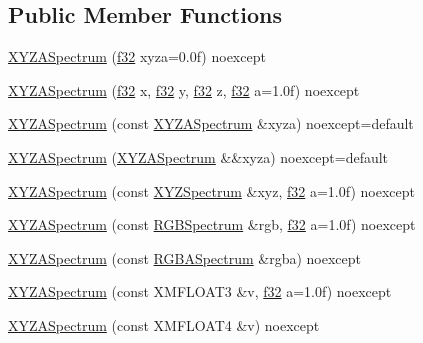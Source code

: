 \subsection*{Public Member Functions}
\begin{DoxyCompactItemize}
\item 
\hyperlink{structmage_1_1_x_y_z_a_spectrum_a1d2fb595a7f0d0d9e37e0bd9f1ce0d74}{X\+Y\+Z\+A\+Spectrum} (\hyperlink{namespacemage_a6a44ad388483959dc4dff9f2aef91431}{f32} xyza=0.\+0f) noexcept
\item 
\hyperlink{structmage_1_1_x_y_z_a_spectrum_a80c216d440ef74dc60fdeda55f2b7474}{X\+Y\+Z\+A\+Spectrum} (\hyperlink{namespacemage_a6a44ad388483959dc4dff9f2aef91431}{f32} x, \hyperlink{namespacemage_a6a44ad388483959dc4dff9f2aef91431}{f32} y, \hyperlink{namespacemage_a6a44ad388483959dc4dff9f2aef91431}{f32} z, \hyperlink{namespacemage_a6a44ad388483959dc4dff9f2aef91431}{f32} a=1.\+0f) noexcept
\item 
\hyperlink{structmage_1_1_x_y_z_a_spectrum_ae088d21ba6cd6684b1347064570a5ff2}{X\+Y\+Z\+A\+Spectrum} (const \hyperlink{structmage_1_1_x_y_z_a_spectrum}{X\+Y\+Z\+A\+Spectrum} \&xyza) noexcept=default
\item 
\hyperlink{structmage_1_1_x_y_z_a_spectrum_a08e4635f76feced3cabc8a8c7289f036}{X\+Y\+Z\+A\+Spectrum} (\hyperlink{structmage_1_1_x_y_z_a_spectrum}{X\+Y\+Z\+A\+Spectrum} \&\&xyza) noexcept=default
\item 
\hyperlink{structmage_1_1_x_y_z_a_spectrum_a386891a5434a510ea532cd023c26124a}{X\+Y\+Z\+A\+Spectrum} (const \hyperlink{structmage_1_1_x_y_z_spectrum}{X\+Y\+Z\+Spectrum} \&xyz, \hyperlink{namespacemage_a6a44ad388483959dc4dff9f2aef91431}{f32} a=1.\+0f) noexcept
\item 
\hyperlink{structmage_1_1_x_y_z_a_spectrum_a8746aecc15212f8eb2d632c2194395ca}{X\+Y\+Z\+A\+Spectrum} (const \hyperlink{structmage_1_1_r_g_b_spectrum}{R\+G\+B\+Spectrum} \&rgb, \hyperlink{namespacemage_a6a44ad388483959dc4dff9f2aef91431}{f32} a=1.\+0f) noexcept
\item 
\hyperlink{structmage_1_1_x_y_z_a_spectrum_ae415378258d5ee71b41a333d2f42f03d}{X\+Y\+Z\+A\+Spectrum} (const \hyperlink{structmage_1_1_r_g_b_a_spectrum}{R\+G\+B\+A\+Spectrum} \&rgba) noexcept
\item 
\hyperlink{structmage_1_1_x_y_z_a_spectrum_af4576ce893a2fc5df06e9aaabd0d4e52}{X\+Y\+Z\+A\+Spectrum} (const X\+M\+F\+L\+O\+A\+T3 \&v, \hyperlink{namespacemage_a6a44ad388483959dc4dff9f2aef91431}{f32} a=1.\+0f) noexcept
\item 
\hyperlink{structmage_1_1_x_y_z_a_spectrum_a12e237f69939ca8b7ef30710a0520771}{X\+Y\+Z\+A\+Spectrum} (const X\+M\+F\+L\+O\+A\+T4 \&v) noexcept

\end{DoxyCompactItemize}
